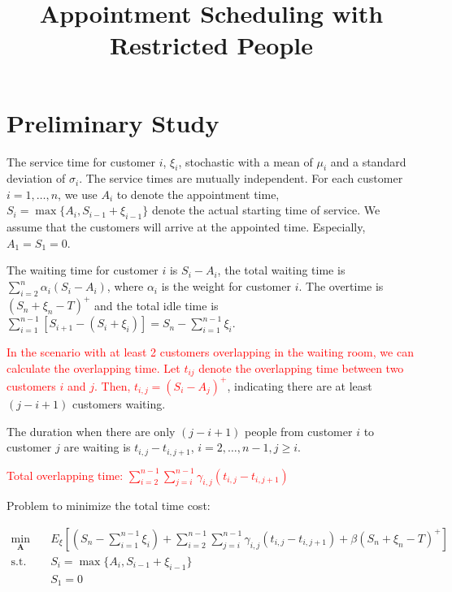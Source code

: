 \documentclass{article}
\title{Appointment Scheduling with Restricted People}
\date{}
\begin{document}
\maketitle

\section{Preliminary Study}

The service time for customer $i$, $\xi_{i}$, stochastic with a mean of $\mu_{i}$ and a standard deviation of $\sigma_{i}$. The service times are mutually independent.
For each customer $i = 1, \ldots, n$, we use $A_{i}$ to denote the appointment time, $S_{i} = \max\{A_{i}, S_{i-1} + \xi_{i-1}\}$ denote the actual starting time of service. We assume that the customers will arrive at the appointed time. Especially, $A_{1} = S_{1} = 0$.

The waiting time for customer $i$ is $S_{i} - A_{i}$, the total waiting time is $\sum_{i=2}^n \alpha_i \left(S_i-A_i\right)$, where $\alpha_i$ is the weight for customer $i$. The overtime is $(S_{n} +\xi_{n} - T)^{+}$ and the total idle time is $\sum_{i=1}^{n-1}[S_{i+1} - (S_{i} + \xi_{i})] = S_{n} - \sum_{i=1}^{n-1} \xi_{i}$.


\textcolor{red}{In the scenario with at least 2 customers overlapping in the waiting room, we can calculate the overlapping time. Let $t_{ij}$ denote the overlapping time between two customers $i$ and $j$. Then, $t_{i,j} = (S_{i} - A_{j})^{+}$}, indicating there are at least $(j-i+1)$ customers waiting.

The duration when there are only $(j-i+1)$ people from customer $i$ to customer $j$ are waiting is $t_{i,j} - t_{i,j+1}$, $i =2, \ldots, n-1, j \geq i$.


\textcolor{red}{Total overlapping time: $\sum_{i=2}^{n-1} \sum_{j=i}^{n-1} \gamma_{i,j} (t_{i,j} - t_{i,j+1})$}

Problem to minimize the total time cost:

\begin{equation}
    \begin{aligned}
        \min_{\mathbf{A}} \quad & E_{\xi}\left[\left(S_n-\sum_{i=1}^{n-1} \xi_i\right)+ \sum_{i=2}^{n-1} \sum_{j=i}^{n-1} \gamma_{i,j} (t_{i,j} - t_{i,j+1}) + \beta(S_{n} +\xi_{n} - T)^{+} \right] \\
        \mbox{s.t.} \quad & S_{i} = \max\{A_{i}, S_{i-1} + \xi_{i-1}\} \\
        & S_{1} = 0
    \end{aligned}
\end{equation}
\end{document}
